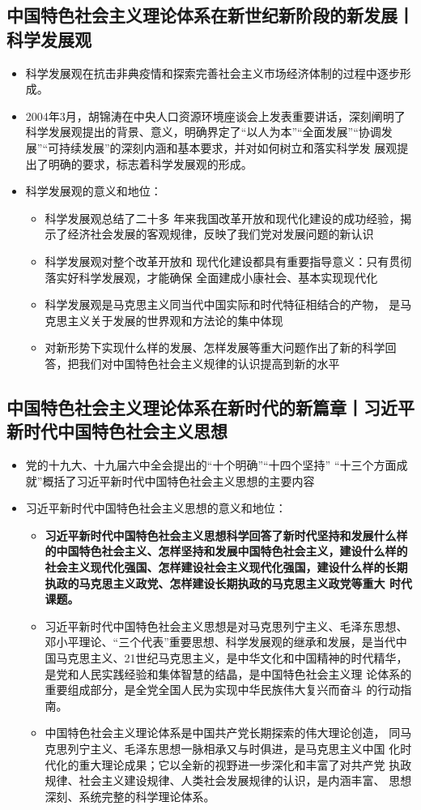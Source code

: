 \documentclass[12pt,openany]{ctexbook}
\begin{document}
\subsection{中国特色社会主义理论体系在新世纪新阶段的新发展丨科学发展观}
\begin{itemize}
  \item 科学发展观在抗击非典疫情和探索完善社会主义市场经济体制的过程中逐步形成。
  \item 2004年3月，胡锦涛在中央人口资源环境座谈会上发表重要讲话，深刻阐明了科学发展观提出的背景、意义，明确界定了“以人为本”“全面发展”“协调发展”“可持续发展”的深刻内涵和基本要求，并对如何树立和落实科学发 展观提出了明确的要求，标志着科学发展观的形成。
  \item 科学发展观的意义和地位：
\begin{itemize}
  \item 科学发展观总结了二十多 年来我国改革开放和现代化建设的成功经验，揭示了经济社会发展的客观规律，反映了我们党对发展问题的新认识
  \item 科学发展观对整个改革开放和 现代化建设都具有重要指导意义：只有贯彻落实好科学发展观，才能确保 全面建成小康社会、基本实现现代化
  \item 科学发展观是马克思主义同当代中国实际和时代特征相结合的产物， 是马克思主义关于发展的世界观和方法论的集中体现
  \item 对新形势下实现什么样的发展、怎样发展等重大问题作出了新的科学回答，把我们对中国特色社会主义规律的认识提高到新的水平
\end{itemize}
\end{itemize}
\subsection{中国特色社会主义理论体系在新时代的新篇章丨习近平新时代中国特色社会主义思想}
\begin{itemize}
  \item 党的十九大、十九届六中全会提出的“十个明确”“十四个坚持” “十三个方面成就”概括了习近平新时代中国特色社会主义思想的主要内容
  \item 习近平新时代中国特色社会主义思想的意义和地位：
\begin{itemize}
  \item \textbf{习近平新时代中国特色社会主义思想科学回答了新时代坚持和发展什么样的中国特色社会主义、怎样坚持和发展中国特色社会主义，建设什么样的社会主义现代化强国、怎样建设社会主义现代化强国，建设什么样的长期执政的马克思主义政党、怎样建设长期执政的马克思主义政党等重大 时代课题。}
  \item 习近平新时代中国特色社会主义思想是对马克思列宁主义、毛泽东思想、邓小平理论、“三个代表”重要思想、科学发展观的继承和发展，是当代中国马克思主义、21世纪马克思主义，是中华文化和中国精神的时代精华，是党和人民实践经验和集体智慧的结晶，是中国特色社会主义理 论体系的重要组成部分，是全党全国人民为实现中华民族伟大复兴而奋斗 的行动指南。
  \item 中国特色社会主义理论体系是中国共产党长期探索的伟大理论创造， 同马克思列宁主义、毛泽东思想一脉相承又与时俱进，是马克思主义中国 化时代化的重大理论成果；它以全新的视野进一步深化和丰富了对共产党 执政规律、社会主义建设规律、人类社会发展规律的认识，是内涵丰富、 思想深刻、系统完整的科学理论体系。
\end{itemize}
\end{itemize}
\end{document}
